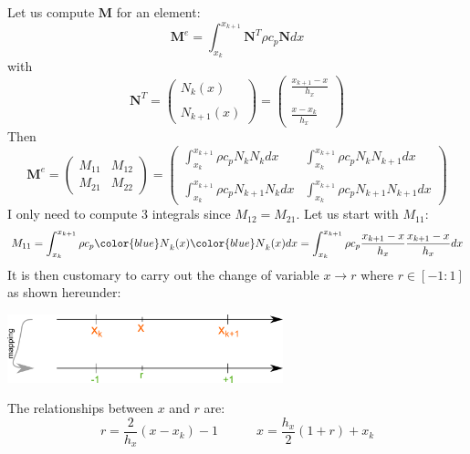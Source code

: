 Let us compute ${\bm M}$ for an element:
\[
{\bm M}^e=  \int_{x_k}^{x_{k+1}}   {\bm N}^T \rho c_p {\bm N} dx  
\]
with 
\[
{\bm N}^T = 
\left(
\begin{array}{c}
N_k(x)  \\ \\  N_{k+1}(x)
\end{array}
\right)
=
\left(
\begin{array}{c}
\frac{x_{k+1}-x}{h_x}   \\ \\
\frac{x-x_k}{h_x} 
\end{array}
\right)
\]
Then 
\[
{\bm M}^e
=
\left(
\begin{array}{cc}
M_{11} & M_{12} \\
M_{21} & M_{22} 
\end{array}
\right)
=
\left(
\begin{array}{cc}
\int_{x_k}^{x_{k+1}} \rho c_p N_k N_{k} dx   &  \int_{x_k}^{x_{k+1}} \rho c_p N_k N_{k+1} dx \\ \\
\int_{x_k}^{x_{k+1}} \rho c_p N_{k+1} N_{k} dx  &  \int_{x_k}^{x_{k+1}} \rho c_p N_{k+1} N_{k+1} dx 
\end{array}
\right)
\]
I only need to compute 3 integrals since $M_{12}=M_{21}$.
Let us start with $M_{11}$:
\[
M_{11}=\int_{x_k}^{x_{k+1}} \rho c_p {\color{blue}N}_k(x) {\color{blue}N}_{k}(x) dx
=   
\int_{x_k}^{x_{k+1}} \rho c_p 
\frac{x_{k+1}-x}{h_x}  
\frac{x_{k+1}-x}{h_x}  
dx
\]
It is then customary to carry out the change of variable $x \rightarrow r$ where 
$r \in [-1:1]$ as shown hereunder:
\begin{center}
\includegraphics[width=8cm]{images/oneD/el1D_mapping}
\end{center}
The relationships between $x$ and $r$ are:
\[
r=\frac{2}{h_x}(x-x_k)-1
\quad\quad\quad
x=\frac{h_x}{2}(1+r)+x_k
\]

